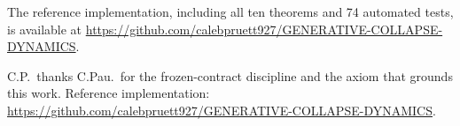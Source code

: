 \documentclass[
  aps,
  prd,
  twocolumn,
  superscriptaddress,
  nofootinbib,
  floatfix
]{revtex4-2}
\begin{document}
The reference implementation, including all ten theorems
and 74 automated tests, is available at
\url{https://github.com/calebpruett927/GENERATIVE-COLLAPSE-DYNAMICS}.

\begin{acknowledgments}
C.P.\ thanks C.Pau.\ for the frozen-contract discipline and
the axiom that grounds this work.  Reference implementation:
\url{https://github.com/calebpruett927/GENERATIVE-COLLAPSE-DYNAMICS}.
\end{acknowledgments}


\end{document}

